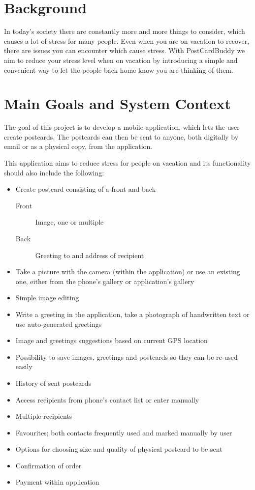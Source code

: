 \documentclass[10pt,a4paper]{article}
\begin{document}
\section{Background}

In today's society there are constantly more and more things to consider, which causes a lot of stress for many people. Even when you are on vacation to recover, there are issues you can encounter which cause stress. With PostCardBuddy we aim to reduce your stress level when on vacation by introducing a simple and convenient way to let the people back home know you are thinking of them. 


\section{Main Goals and System Context}
The goal of this project is to develop a mobile application, which lets the user create postcards. The postcards can then be sent to anyone, both digitally by email or as a physical copy, from the application. 

This application aims to reduce stress for people on vacation and its functionality should also include the following:

\begin{itemize}
\item Create postcard consisting of a front and back
\begin{description}
\item[Front] Image, one or multiple
\item[Back] Greeting to and address of recipient
\end{description}
\item Take a picture with the camera (within the application) or use an existing one, either from the phone's gallery or application's gallery
\item Simple image editing
\item Write a greeting in the application, take a photograph of handwritten text or use auto-generated greetings
\item Image and greetings suggestions based on current GPS location
\item Possibility to save images, greetings and postcards so they can be re-used easily
\item History of sent postcards
\item Access recipients from phone's contact list or enter manually
\item Multiple recipients
\item Favourites; both contacts frequently used and marked manually by user
\item Options for choosing size and quality of physical postcard to be sent
\item Confirmation of order
\item Payment within application
\end{itemize}
\end{document}
